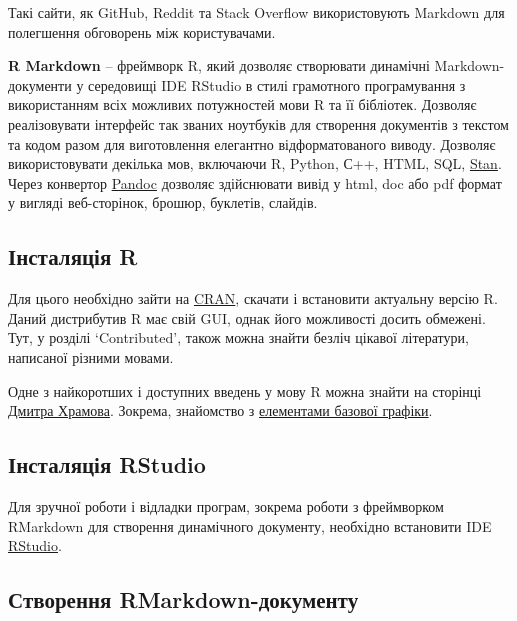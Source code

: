 \documentclass[
]{book}
\begin{document}
Такі сайти, як GitHub, Reddit та Stack Overflow використовують Markdown для полегшення обговорень між користувачами.

\textbf{R Markdown} \citep{RMark} -- фреймворк R, який дозволяє створювати динамічні Markdown-документи у середовищі IDE RStudio в стилі грамотного програмування з використанням всіх можливих потужностей мови R та її бібліотек. Дозволяє реалізовувати інтерфейс так званих ноутбуків для створення документів з текстом та кодом разом для виготовлення елегантно відформатованого виводу. Дозволяє використовувати декілька мов, включаючи R, Python, С++, HTML, SQL, \href{http://mc-stan.org/}{Stan}. Через конвертор \href{http://pandoc.org/}{Pandoc} дозволяє здійснювати вивід у html, doc або pdf формат у вигляді веб-сторінок, брошюр, буклетів, слайдів.

\hypertarget{ux456ux43dux441ux442ux430ux43bux44fux446ux456ux44f-r}{%
\subsection{Інсталяція R}\label{ux456ux43dux441ux442ux430ux43bux44fux446ux456ux44f-r}}

Для цього необхідно зайти на \href{https://cran.r-project.org/}{CRAN}, скачати і встановити актуальну версію R. Даний дистрибутив R має свій GUI, однак його можливості досить обмежені. Тут, у розділі `Contributed', також можна знайти безліч цікавої літератури, написаної різними мовами.

Одне з найкоротших і доступних введень у мову R можна знайти на сторінці \href{http://dkhramov.dp.ua/Comp.R.html\#.Wpetc1rFJdj}{Дмитра Храмова}. Зокрема, знайомство з \href{http://dkhramov.dp.ua/images/edu/Stu.WebMining/ch04_graphics.pdf}{елементами базової графіки}.

\hypertarget{ux456ux43dux441ux442ux430ux43bux44fux446ux456ux44f-rstudio}{%
\subsection{Інсталяція RStudio}\label{ux456ux43dux441ux442ux430ux43bux44fux446ux456ux44f-rstudio}}

Для зручної роботи і відладки програм, зокрема роботи з фреймворком RMarkdown для створення динамічного документу, необхідно встановити IDE \href{https://www.rstudio.com/products/rstudio/download/}{RStudio}.

\hypertarget{CreateRMarkdown}{%
\subsection{Створення RMarkdown-документу}\label{CreateRMarkdown}}
\end{document}

